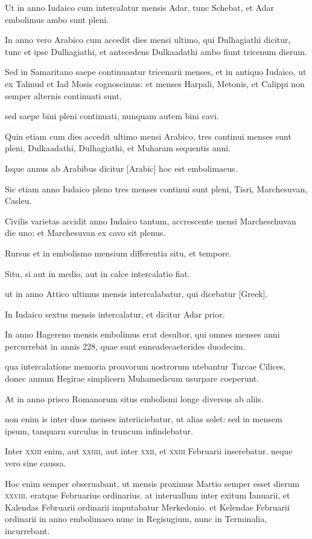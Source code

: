 Ut in anno Iudaico cum intercalatur mensis Adar, tunc
Schebat, et Adar embolimus ambo sunt pleni.

In anno vero Arabico
cum accedit dies mensi ultimo, qui Dulhagiathi dicitur, tunc et ipse
Dulhagiathi, et antecedens Dulkaadathi ambo fiunt tricenum dierum.

Sed in Samaritano saepe continuantur tricenarii menses, et in antiquo
Iudaico, ut ex Talmud et Iad Mosis cognoscimus: et menses Harpali,
Metonis, et Calippi non semper alternis continuati sunt.

sed saepe bini
pleni continuati, nunquam autem bini cavi.

Quin etiam cum dies accedit
ultimo mensi Arabico, tres continui menses sunt pleni, Dulkaadathi,
Dulhagiathi, et Muharam sequentis anni.

Isque annus ab Arabibus
dicitur \textarabic{[Arabic]} hoc est embolimaeus.

Sic etiam anno Iudaico pleno
tres menses continui sunt pleni, Tisri, Marchesuvan, Casleu.

Civilis
varietas accidit anno Iudaico tantum, accrescente mensi Marcheschuvan
die uno: et Marchesuvan ex cavo sit plenus.

Rursus et in embolismo
mensium differentia situ, et tempore.

Situ, si aut in medio, aut in calce
intercalatio fiat.

ut in anno Attico ultimus mensis intercalabatur, qui
dicebatur \textgreek{[Greek]}.

In Iudaico sextus mensis intercalatur, et
dicitur Adar prior.

In anno Hagereno mensis embolimus erat desultor,
qui omnes menses anni percurrebat in annis 228, quae sunt enneadecaeterides
duodecim.

qua intercalatione memoria proavorum nostrorum
utebantur Turcae Cilices, donec annum Hegirae simplicern
Muhamedicum usurpare coeperunt.

At in anno prisco Romanorum
situs embolismi longe diversus ab aliis.

non enim is inter duos
menses interiiciebatur, ut alias solet: sed in mensem ipsum, tanquarn
surculus in truncum infindebatur.

Inter \textsc{xxiii} enim, aut \textsc{xxiiii},
aut inter \textsc{xxii}, et \textsc{xxiii} Februarii inserebatur.
neque vero sine caussa.

Hoc enim semper obseruabant, ut mensis proximus Martio semper esset
dierum \textsc{xxviii}.
eratque Februarius ordinarius. at interuallum inter exitum
Ianuarii, et Kalendas Februarii ordinarii imputabatur Merkedonio.
et Kelendae Februarii ordinarii in anno embolimaeo nunc in Regisugium,
nunc in Terminalia, incurrebant.

